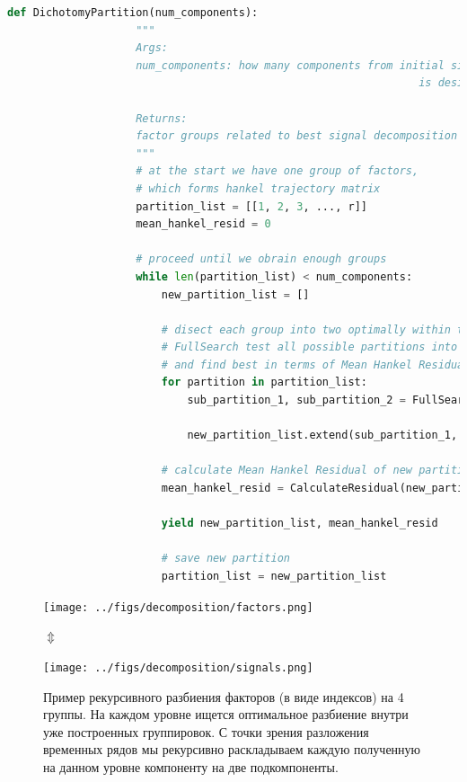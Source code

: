 	    	\begin{lstlisting}[language=Python, caption={Псевдокод процедуры рекурсивного получения декомпозиции временного ряда},]
	    		def DichotomyPartition(num_components):
	    			"""
	    			Args:
	    			num_components: how many components from initial signal
	    							 							is desired 
		    		
	    			Returns:
	    			factor groups related to best signal decomposition
	    			"""
	    			# at the start we have one group of factors,
	    			# which forms hankel trajectory matrix
	    			partition_list = [[1, 2, 3, ..., r]]
	    			mean_hankel_resid = 0
	    			
	    			# proceed until we obrain enough groups
	    			while len(partition_list) < num_components:
	    				new_partition_list = []
	    		
	    				# disect each group into two optimally within this group
	    				# FullSearch test all possible partitions into 2 groups
	    				# and find best in terms of Mean Hankel Residual
	    				for partition in partition_list:
	    					sub_partition_1, sub_partition_2 = FullSearch(partition)
	    		
	    					new_partition_list.extend(sub_partition_1, sub_partition_2)
	    		
	    				# calculate Mean Hankel Residual of new partition 
	    				mean_hankel_resid = CalculateResidual(new_partition_list)
	    				
	    				yield new_partition_list, mean_hankel_resid
	    				
	    				# save new partition
	    				partition_list = new_partition_list    		
	    	\end{lstlisting}
	    	
	    	\begin{figure}[h!]
	    		\centering
	    		\texttt{[image: ../figs/decomposition/factors.png]}    
	    		
	    		$ \Updownarrow $
	    				
	    		\texttt{[image: ../figs/decomposition/signals.png]}	
	    		
	    		\caption{Пример рекурсивного разбиения факторов (в виде индексов) на 4 группы. На каждом уровне ищется оптимальное разбиение внутри уже построенных группировок. С точки зрения разложения временных рядов мы рекурсивно раскладываем каждую полученную на данном уровне компоненту на две подкомпоненты.}\label{pic:decomp_conception}
	    	\end{figure}
	    	
